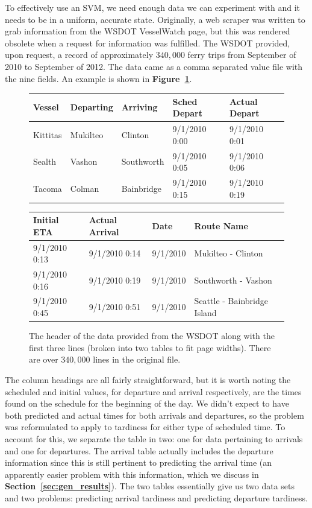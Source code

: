 \documentclass[11pt]{article} %
\begin{document}
To effectively use an SVM, we need enough data we can experiment with and it needs
to be in a uniform, accurate state. Originally, a web scraper was written to grab
information from the WSDOT VesselWatch \cite{wsdotVesselWatch} page, but this was 
rendered obsolete when a request for information was fulfilled. The WSDOT 
provided, upon request, a record of
approximately $340,000$ ferry trips from September of 2010 to September of 2012. The
data came as a comma separated value file with the nine fields. An example is shown
in \textbf{Figure~\ref{fig:example_wsdot_data}}.

\begin{figure}
    \centering
    \begin{tabular}[h]{lllll}
        \hline
        Vessel & Departing & Arriving & Sched Depart & Actual Depart \\
        \hline
        Kittitas & Mukilteo & Clinton & 9/1/2010 0:00 & 9/1/2010 0:01 \\
        Sealth & Vashon & Southworth & 9/1/2010 0:05 & 9/1/2010 0:06 \\
        Tacoma & Colman & Bainbridge & 9/1/2010 0:15 & 9/1/2010 0:19 \\
    \end{tabular}

    \begin{tabular}[h]{llll}
        \hline
        Initial ETA & Actual Arrival & Date & Route Name\\
        \hline
        9/1/2010 0:13 & 9/1/2010 0:14 & 9/1/2010 & Mukilteo - Clinton \\
        9/1/2010 0:16 & 9/1/2010 0:19 & 9/1/2010 & Southworth - Vashon \\
        9/1/2010 0:45 & 9/1/2010 0:51 & 9/1/2010 & Seattle - Bainbridge Island \\
    \end{tabular}
    \caption{The header of the data provided from the WSDOT along with the first
        three lines (broken into two tables
        to fit page widths). There are over $340,000$ lines in the original file.}
    \label{fig:example_wsdot_data}
\end{figure}

The column headings are all fairly straightforward, but it is worth noting the
scheduled and initial values, for departure and arrival respectively, are the
times found on the schedule for the beginning of the day. We didn't expect to 
have both predicted and actual times for both arrivals and departures, so the
problem was reformulated to apply to tardiness for either type of scheduled
time. To account for this, we separate the table in two: one for
data pertaining to arrivals and one for departures. The arrival table actually 
includes the departure information since this is still pertinent to predicting
the arrival time (an apparently easier problem with this information, which we
discuss in \textbf{Section~\ref{sec:gen_results}}). The two tables essentially
give us two data sets and two problems: predicting arrival tardiness and predicting 
departure tardiness.
\end{document}
